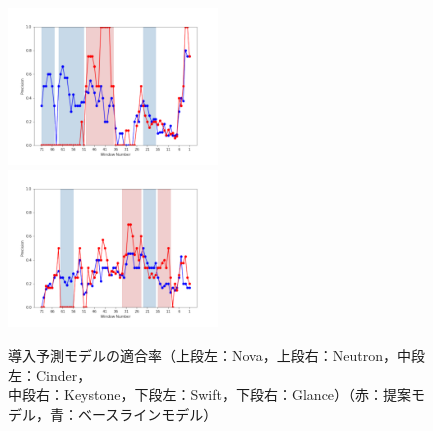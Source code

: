 \documentclass[11pt]{jreport}
\begin{document}
\begin{figure}[H]
\begin{minipage}{\textwidth}
\begin{center}
    \includegraphics[width=0.495\textwidth]{Uenaka_fig/RQ1_result/Swift_merge_Precision.pdf}
    \includegraphics[width=0.495\textwidth]{Uenaka_fig/RQ1_result/Glance_merge_Precision.pdf}
    \caption{導入予測モデルの適合率（上段左：Nova，上段右：Neutron，中段左：Cinder，\\ 中段右：Keystone，下段左：Swift，下段右：Glance）（赤：提案モデル，青：ベースラインモデル）}
    \label{fig:merge_p}
\end{center}
\vspace{0.08\textheight}
\end{minipage}
\end{figure}
\end{document}
